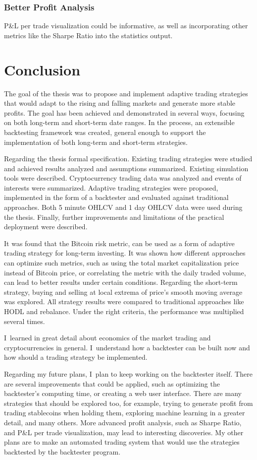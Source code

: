 \subsection*{Better Profit Analysis}
P\&L per trade visualization could be informative, as well as incorporating other metrics like the Sharpe Ratio into the statistics output.

\chapter{Conclusion}
\label{conclusion}
The goal of the thesis was to propose and implement adaptive trading strategies that would adapt to the rising and falling markets and generate more stable profits. The goal has been achieved and demonstrated in several ways, focusing on both long-term and short-term date ranges. In the process, an extensible backtesting framework was created, general enough to support the implementation of both long-term and short-term strategies.

Regarding the thesis formal specification. Existing trading strategies were studied and achieved results analyzed and assumptions summarized. Existing simulation tools were described. Cryptocurrency trading data was analyzed and events of interests were summarized. Adaptive trading strategies were proposed, implemented in the form of a backtester and evaluated against traditional approaches. Both 5 minute OHLCV and 1 day OHLCV data were used during the thesis. Finally, further improvements and limitations of the practical deployment were described.

It was found that the Bitcoin risk metric, can be used as a form of adaptive trading strategy for long-term investing. It was shown how different approaches can optimize such metrics, such as using the total market capitalization price instead of Bitcoin price, or correlating the metric with the daily traded volume, can lead to better results under certain conditions. Regarding the short-term strategy, buying and selling at local extrema of price's smooth moving average was explored. All strategy results were compared to traditional approaches like HODL and rebalance. Under the right criteria, the performance was multiplied several times.

I~learned in great detail about economics of the market trading and cryptocurrencies in general. I~understand how a backtester can be built now and how should a trading strategy be implemented.

Regarding my future plans, I~plan to keep working on the backtester itself. There are several improvements that could be applied, such as optimizing the backtester's computing time, or creating a web user interface. There are many strategies that should be explored too, for example, trying to generate profit from trading stablecoins when holding them, exploring machine learning in a greater detail, and many others. More advanced profit analysis, such as Sharpe Ratio, and P\&L per trade visualization, may lead to interesting discoveries. My other plans are to make an automated trading system that would use the strategies backtested by the backtester program.
